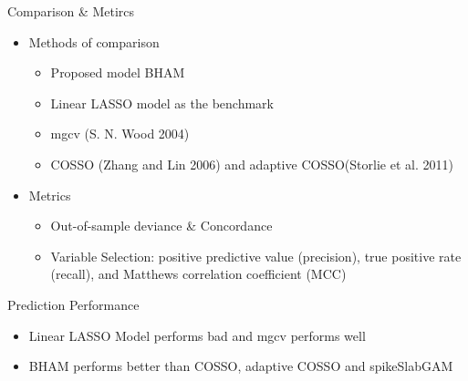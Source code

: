 \documentclass[
  ignorenonframetext,
  aspectratio=169]{beamer}
\providecommand{\tightlist}{%
  \setlength{\itemsep}{0pt}\setlength{\parskip}{0pt}}
\begin{document}
\begin{frame}{Comparison \& Metircs}
\protect\hypertarget{comparison-metircs-1}{}
\begin{itemize}
\tightlist
\item
  Methods of comparison

  \begin{itemize}
  \tightlist
  \item
    Proposed model BHAM
  \item
    Linear LASSO model as the benchmark
  \item
    mgcv (S. N. Wood 2004)
  \item
    COSSO (Zhang and Lin 2006) and adaptive COSSO(Storlie et al. 2011)
  \end{itemize}
\item
  Metrics

  \begin{itemize}
  \tightlist
  \item
    Out-of-sample deviance \& Concordance
  \item
    Variable Selection: positive predictive value (precision), true
    positive rate (recall), and Matthews correlation coefficient (MCC)
  \end{itemize}
\end{itemize}
\end{frame}

\begin{frame}{Prediction Performance}
\protect\hypertarget{prediction-performance-1}{}
\begin{itemize}
\tightlist
\item
  Linear LASSO Model performs bad and mgcv performs well
\item
  BHAM performs better than COSSO, adaptive COSSO and spikeSlabGAM
\end{itemize}
\end{frame}
\end{document}
